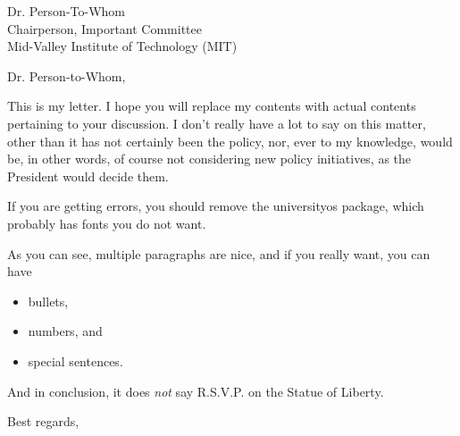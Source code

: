 \documentclass[11pt,letterpaper,oneside]{ucletter}
\begin{document}
\begin{letter}
{Dr. Person-To-Whom\\
Chairperson, Important Committee\\
Mid-Valley Institute of Technology (MIT)}

\opening{Dr. Person-to-Whom,}

This is my letter. I hope you will replace my contents with actual contents pertaining to your discussion. I don't really have a lot to say on this matter, other than it has not certainly been the policy, nor, ever to my knowledge, would be, in other words, of course not considering new policy initiatives, as the President would decide them.

If you are getting errors, you should remove the universityos package, which probably has fonts you do not want.

As you can see, multiple paragraphs are nice, and if you really want, you can have
\begin{itemize}
	\item bullets,
	\item numbers, and
	\item special sentences.
\end{itemize}

And in conclusion, it does \emph{not} say R.S.V.P. on the Statue of Liberty.

\closing{Best regards,}

\end{letter}
\end{document}
